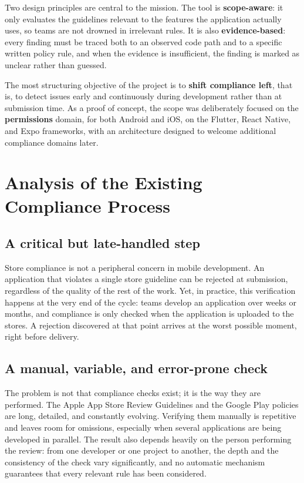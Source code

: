 Two design principles are central to the mission. The tool is \textbf{scope-aware}: it only evaluates the guidelines relevant to the features the application actually uses, so teams are not drowned in irrelevant rules. It is also \textbf{evidence-based}: every finding must be traced both to an observed code path and to a specific written policy rule, and when the evidence is insufficient, the finding is marked as unclear rather than guessed.

The most structuring objective of the project is to \textbf{shift compliance left}, that is, to detect issues early and continuously during development rather than at submission time. As a proof of concept, the scope was deliberately focused on the \textbf{permissions} domain, for both Android and iOS, on the Flutter, React Native, and Expo frameworks, with an architecture designed to welcome additional compliance domains later.

\section{Analysis of the Existing Compliance Process}

\subsection{A critical but late-handled step}

Store compliance is not a peripheral concern in mobile development. An application that violates a single store guideline can be rejected at submission, regardless of the quality of the rest of the work. Yet, in practice, this verification happens at the very end of the cycle: teams develop an application over weeks or months, and compliance is only checked when the application is uploaded to the stores. A rejection discovered at that point arrives at the worst possible moment, right before delivery.

\subsection{A manual, variable, and error-prone check}

The problem is not that compliance checks exist; it is the way they are performed. The Apple App Store Review Guidelines and the Google Play policies are long, detailed, and constantly evolving. Verifying them manually is repetitive and leaves room for omissions, especially when several applications are being developed in parallel. The result also depends heavily on the person performing the review: from one developer or one project to another, the depth and the consistency of the check vary significantly, and no automatic mechanism guarantees that every relevant rule has been considered.

